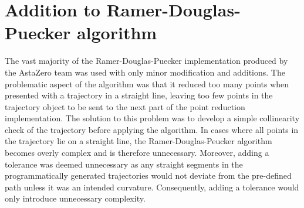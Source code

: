 \section{Addition to Ramer-Douglas-Puecker algorithm}
\label{sec:alt_douglas_peucker_algo}
The vast majority of the Ramer-Douglas-Puecker implementation produced by the AstaZero team was used with only minor modification and additions. The problematic aspect of the algorithm was that it reduced too many points when presented with a trajectory in a straight line, leaving too few points in the trajectory object to be sent to the next part of the point reduction implementation. The solution to this problem was to develop a simple collinearity check of the trajectory before applying the algorithm. In cases where all points in the trajectory lie on a straight line, the Ramer-Douglas-Peucker algorithm becomes overly complex and is therefore unnecessary. Moreover, adding a tolerance was deemed unnecessary as any straight segments in the programmatically generated trajectories would not deviate from the pre-defined path unless it was an intended curvature. Consequently, adding a tolerance would only introduce unnecessary complexity.
\newline

